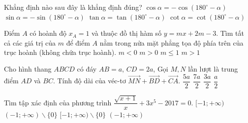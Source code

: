 \begin{ex}%
        Khẳng định nào sau đây là khẳng định đúng?
        \choice        
        {\True $\cos \alpha =-\cos (180^\circ -\alpha)$}
        {$\sin \alpha =-\sin(180^\circ-\alpha)$}
        {$\tan \alpha =\tan (180^\circ -\alpha)$}
        {$\cot \alpha =\cot(180^\circ-\alpha)$}
\end{ex}
\begin{ex}%
        Điểm $A$ có hoành độ $x_A=1$ và thuộc đồ thị hàm số $y=mx+2m-3$. Tìm tất cả các giá trị của $m$ để điểm $A$ nằm trong nửa mặt phẳng tọa độ phía trên của trục hoành (không chứa trục hoành).
        \choice        
        {$m<0$}
        {$m>0$}
        {$m\le 1$}
        {\True $m>1$}
\end{ex}
\begin{ex}%
        Cho hình thang $ABCD$ có đáy $AB=a$, $CD=2a$, Gọi $M,N$ lần lượt là trung điểm $AD$ và $BC$. Tính độ dài của véc-tơ $\vec{MN}+\vec{BD}+\vec{CA}$.
        \choice        
        {$\dfrac{5a}{2}$}
        {$\dfrac{7a}{2}$}
        {\True $\dfrac{3a}{2}$}
        {$\dfrac{a}{2}$}
\end{ex}
\begin{ex}%
        Tìm tập xác định của phương trình $\dfrac{\sqrt{x+1}}{x}+3x^5-2017=0$.
        \choice        
        {$[-1;+\infty)$}
        {$(-1;+\infty)\backslash \{0\}$}
        {\True $[-1;+\infty)\backslash \{0\}$}
        {$(-1;+\infty)$}
\end{ex}
